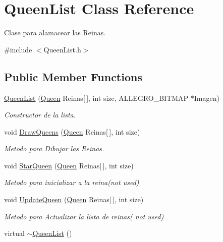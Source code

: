 \hypertarget{class_queen_list}{}\section{Queen\+List Class Reference}
\label{class_queen_list}


Clase para alamacear las Reinas.  




{\ttfamily \#include $<$Queen\+List.\+h$>$}

\subsection*{Public Member Functions}
\begin{DoxyCompactItemize}
\item 
\hyperlink{class_queen_list_a8da503b129e3001f41b33aceac3aab0f}{Queen\+List} (\hyperlink{class_queen}{Queen} Reinas\mbox{[}$\,$\mbox{]}, int size, A\+L\+L\+E\+G\+R\+O\+\_\+\+B\+I\+T\+M\+AP $\ast$Imagen)
\begin{DoxyCompactList}\small\item\em Constructor de la lista. \end{DoxyCompactList}\item 
void \hyperlink{class_queen_list_a1afb3a3963b23ec1e959ac014986d697}{Draw\+Queens} (\hyperlink{class_queen}{Queen} Reinas\mbox{[}$\,$\mbox{]}, int size)
\begin{DoxyCompactList}\small\item\em Metodo para Dibujar las Reinas. \end{DoxyCompactList}\item 
void \hyperlink{class_queen_list_a7c681fcfc96c5804ea62a6bc0f643c29}{Star\+Queen} (\hyperlink{class_queen}{Queen} Reinas\mbox{[}$\,$\mbox{]}, int size)
\begin{DoxyCompactList}\small\item\em Metodo para inicializar a la reina(not used) \end{DoxyCompactList}\item 
void \hyperlink{class_queen_list_a01d2804b98bda4e492fd96f328168ecb}{Update\+Queen} (\hyperlink{class_queen}{Queen} Reinas\mbox{[}$\,$\mbox{]}, int size)
\begin{DoxyCompactList}\small\item\em Metodo para Actualizar la lista de reinas( not used) \end{DoxyCompactList}\item 
virtual \hyperlink{class_queen_list_aa427af2634901d7de29e414d85d0921a}{$\sim$\+Queen\+List} ()
\end{DoxyCompactItemize}


